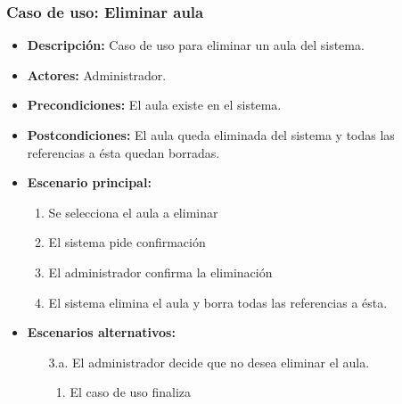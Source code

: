 \documentclass{book}
\begin{document}
\subsubsection*{Caso de uso: Eliminar aula}
\begin{itemize}
\item{\bf Descripción:} Caso de uso para eliminar un aula del sistema.
\item{\bf Actores:} Administrador.
\item{\bf Precondiciones:} El aula existe en el sistema.
\item{\bf Postcondiciones:} El aula queda eliminada del sistema y todas las referencias a ésta quedan borradas.
\item{\bf Escenario principal:}
	\begin{enumerate}
	\item Se selecciona el aula a eliminar
	\item El sistema pide confirmación
	\item El administrador confirma la eliminación
	\item El sistema elimina el aula y borra todas las referencias a ésta.
	\end{enumerate}
\item{\bf Escenarios alternativos:}
	\begin{itemize}
		\item[3.a.] El administrador decide que no desea eliminar el aula.
		\begin{enumerate}
			\item El caso de uso finaliza
		\end{enumerate}
	\end{itemize}
\end{itemize}
\end{document}
